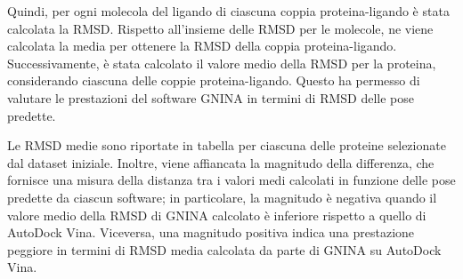 Quindi, per ogni molecola del ligando di ciascuna coppia proteina-ligando è stata calcolata la RMSD. Rispetto all'insieme delle RMSD per le molecole, ne viene calcolata la media per ottenere la RMSD della coppia proteina-ligando. Successivamente, è stata calcolato il valore medio della RMSD per la proteina, considerando ciascuna delle coppie proteina-ligando. Questo ha permesso di valutare le prestazioni del software GNINA in termini di RMSD delle pose predette. 

Le RMSD medie sono riportate in tabella per ciascuna delle proteine selezionate dal dataset iniziale. Inoltre, viene affiancata la magnitudo della differenza, che fornisce una misura della distanza tra i valori medi calcolati in funzione delle pose predette da ciascun software; in particolare, la magnitudo è negativa quando il valore medio della RMSD di GNINA calcolato è inferiore rispetto a quello di AutoDock Vina. Viceversa, una magnitudo positiva indica una prestazione peggiore in termini di RMSD media calcolata da parte di GNINA su AutoDock Vina. 

